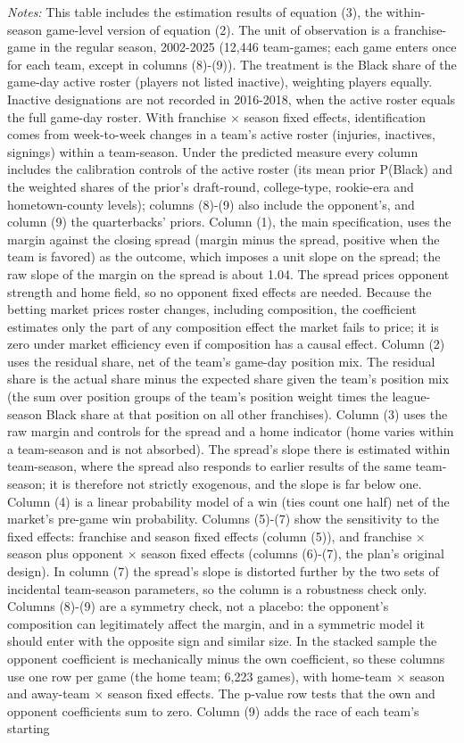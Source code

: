 {\footnotesize
\noindent\textit{Notes:} This table includes the estimation results of equation (3), the within-season game-level version of equation (2). The unit of observation is a franchise-game in the regular season, 2002-2025 (12,446 team-games; each game enters once for each team, except in columns (8)-(9)). The treatment is the Black share of the game-day active roster (players not listed inactive), weighting players equally. Inactive designations are not recorded in 2016-2018, when the active roster equals the full game-day roster. With franchise $\times$ season fixed effects, identification comes from week-to-week changes in a team's active roster (injuries, inactives, signings) within a team-season. Under the predicted measure every column includes the calibration controls of the active roster (its mean prior P(Black) and the weighted shares of the prior's draft-round, college-type, rookie-era and hometown-county levels); columns (8)-(9) also include the opponent's, and column (9) the quarterbacks' priors. Column (1), the main specification, uses the margin against the closing spread (margin minus the spread, positive when the team is favored) as the outcome, which imposes a unit slope on the spread; the raw slope of the margin on the spread is about 1.04. The spread prices opponent strength and home field, so no opponent fixed effects are needed. Because the betting market prices roster changes, including composition, the coefficient estimates only the part of any composition effect the market fails to price; it is zero under market efficiency even if composition has a causal effect. Column (2) uses the residual share, net of the team's game-day position mix. The residual share is the actual share minus the expected share given the team's position mix (the sum over position groups of the team's position weight times the league-season Black share at that position on all other franchises). Column (3) uses the raw margin and controls for the spread and a home indicator (home varies within a team-season and is not absorbed). The spread's slope there is estimated within team-season, where the spread also responds to earlier results of the same team-season; it is therefore not strictly exogenous, and the slope is far below one. Column (4) is a linear probability model of a win (ties count one half) net of the market's pre-game win probability. Columns (5)-(7) show the sensitivity to the fixed effects: franchise and season fixed effects (column (5)), and franchise $\times$ season plus opponent $\times$ season fixed effects (columns (6)-(7), the plan's original design). In column (7) the spread's slope is distorted further by the two sets of incidental team-season parameters, so the column is a robustness check only. Columns (8)-(9) are a symmetry check, not a placebo: the opponent's composition can legitimately affect the margin, and in a symmetric model it should enter with the opposite sign and similar size. In the stacked sample the opponent coefficient is mechanically minus the own coefficient, so these columns use one row per game (the home team; 6,223 games), with  home-team $\times$ season and away-team $\times$ season fixed effects. The p-value row tests that the own and opponent coefficients sum to zero. Column (9) adds the race of each team's starting }
